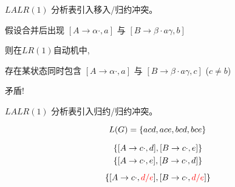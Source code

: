 \begin{frame}{}
  \begin{center}

    \pause
    \begin{theorem}
      $LALR(1)$ 分析表引入移入/归约冲突。
    \end{theorem}

    \pause
    \vspace{0.50cm}

    \vspace{0.30cm}
    假设合并后出现 $[A \to \alpha \cdot, a]$ 与 $[B \to \beta \cdot a \gamma, b]$

    \pause
    \vspace{0.60cm}
    则在$LR(1)$自动机中,

    \vspace{0.20cm}
    存在某状态同时包含 $[A \to \alpha \cdot, a]$ 与 $[B \to \beta \cdot a \gamma, c]$ ($c \neq b$)

    \pause
    \vspace{0.60cm}
    矛盾!
  \end{center}
\end{frame}

\begin{frame}{}
  \begin{center}

    \begin{theorem}
      $LALR(1)$ 分析表引入归约/归约冲突。
    \end{theorem}

    \pause
    \[
      L(G) = \{acd, ace, bcd, bce\}
    \]

    \pause
    \vspace{-0.30cm}
    \begin{gather*}
      \{[A \to c \cdot, d], [B \to c \cdot, e]\} \\
      \{[A \to c \cdot, e], [B \to c \cdot, d]\} \\[5pt]
      \{[A \to c \cdot, \textcolor{red}{d/e}], [B \to c \cdot, \textcolor{red}{d/e}]\} \\
    \end{gather*}
  \end{center}
\end{frame}

